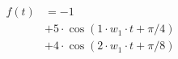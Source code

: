 \begin{center}
\begin{align*}
f(t)
&= -1 \\
&+ 5 \cdot \cos( 1 \cdot w_1 \cdot t + \pi/4) \\
&+ 4 \cdot \cos( 2 \cdot w_1 \cdot t + \pi/8)
\end{align*}
\end{center}
